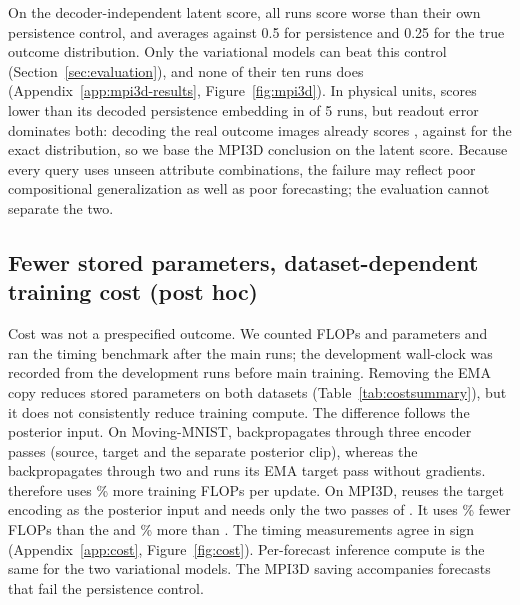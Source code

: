 On the decoder-independent latent score, all \VMPLoseToPersistence{} runs score worse than their own persistence control, and \shvar{} averages \VMPSOneLatentES{} against 0.5 for persistence and 0.25 for the true outcome distribution. Only the variational models can beat this control (Section~\ref{sec:evaluation}), and none of their ten runs does (Appendix~\ref{app:mpi3d-results}, Figure~\ref{fig:mpi3d}). In physical units, \shvar{} scores lower than its decoded persistence embedding in \VMPSOneBeatsOwnPhysPersist{} of 5 runs, but readout error dominates both: decoding the real outcome images already scores \VMPSOneOracleED, against \VMPRefOracle{} for the exact distribution, so we base the MPI3D conclusion on the latent score. Because every query uses unseen attribute combinations, the failure may reflect poor compositional generalization as well as poor forecasting; the evaluation cannot separate the two.

\subsection{Fewer stored parameters, dataset-dependent training cost (post hoc)}
\label{sec:cost}

\begin{table}[t]
\caption{\shvar{} relative to the \emavar{} (post hoc, secondary). Negative percentages indicate reductions. FLOPs are analytic matrix-multiplication and convolution counts per training update; stored parameters include the EMA copy, and trainable parameter counts are equal. Equal update budgets give a recipe comparison rather than a cost-matched accuracy comparison. Appendix~\ref{app:cost} gives the absolute values, counter scope and timing measurements.}
\label{tab:costsummary}
\centering
\small

\end{table}

Cost was not a prespecified outcome. We counted FLOPs and parameters and ran the timing benchmark after the main runs; the development wall-clock was recorded from the development runs before main training. Removing the EMA copy reduces stored parameters on both datasets (Table~\ref{tab:costsummary}), but it does not consistently reduce training compute. The difference follows the posterior input. On Moving-MNIST, \shvar{} backpropagates through three encoder passes (source, target and the separate posterior clip), whereas the \emavar{} backpropagates through two and runs its EMA target pass without gradients. \shvar{} therefore uses \VMMCostFlopsVsROne\% more training FLOPs per update. On MPI3D, \shvar{} reuses the target encoding as the posterior input and needs only the two passes of \shdet{}. It uses \VMPCostFlopsVsROne\% fewer FLOPs than the \emavar{} and \VMPCostFlopsVsSZero\% more than \shdet{}. The timing measurements agree in sign (Appendix~\ref{app:cost}, Figure~\ref{fig:cost}). Per-forecast inference compute is the same for the two variational models. The MPI3D saving accompanies forecasts that fail the persistence control.
